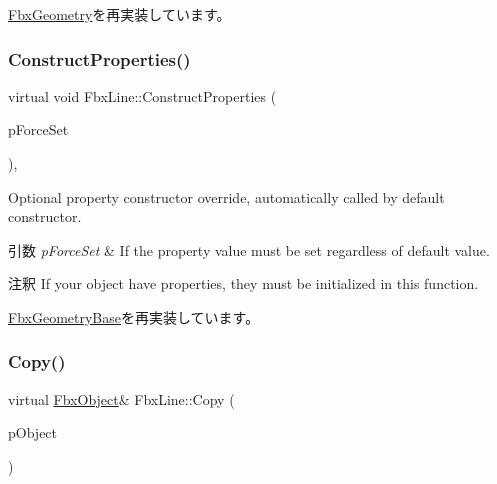 \hyperlink{class_fbx_geometry_a26ca96a86f17783c45ff83b33d2b5324}{Fbx\+Geometry}を再実装しています。

\mbox{\label{class_fbx_line_a48df4b6cd889814d3fe7ca5bb09bcc78}} 
\subsubsection{\texorpdfstring{Construct\+Properties()}{ConstructProperties()}}
{\footnotesize\ttfamily virtual void Fbx\+Line\+::\+Construct\+Properties (\begin{DoxyParamCaption}\item[{bool}]{p\+Force\+Set }\end{DoxyParamCaption})\hspace{0.3cm}{\ttfamily [protected]}, {\ttfamily [virtual]}}

Optional property constructor override, automatically called by default constructor. 
\begin{DoxyParams}{引数}
{\em p\+Force\+Set} & If the property value must be set regardless of default value. \\
\hline
\end{DoxyParams}
\begin{DoxyRemark}{注釈}
If your object have properties, they must be initialized in this function. 
\end{DoxyRemark}


\hyperlink{class_fbx_geometry_base_a94ee142ac1d40be3aebb4d9441431921}{Fbx\+Geometry\+Base}を再実装しています。

\mbox{\label{class_fbx_line_aeb9e0c53cf02d3e4e206b25c87c06256}} 
\subsubsection{\texorpdfstring{Copy()}{Copy()}}
{\footnotesize\ttfamily virtual \hyperlink{class_fbx_object}{Fbx\+Object}\& Fbx\+Line\+::\+Copy (\begin{DoxyParamCaption}\item[{const \hyperlink{class_fbx_object}{Fbx\+Object} \&}]{p\+Object }\end{DoxyParamCaption})\hspace{0.3cm}{\ttfamily [virtual]}}

